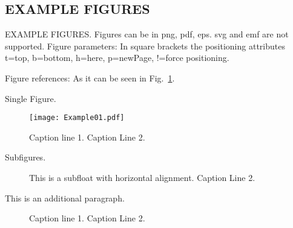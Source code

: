 \subsection{EXAMPLE FIGURES}
\par EXAMPLE FIGURES. Figures can be in png, pdf, eps. svg and emf are not supported.
Figure parameters: In square brackets the positioning attributes t=top, b=bottom, h=here, p=newPage, !=force positioning.
\par Figure references: As it can be seen in Fig.~\ref{fig:SingleFigure}.
\par Single Figure.
\begin{figure}[t]
	\centering
	\texttt{[image: Example01.pdf]}
	\captionsetup{justification=justified}
	\caption{Caption line 1. \newline Caption Line 2.}
	\label{fig:SingleFigure}
\end{figure}

\par Subfigures.
\begin{figure*}[t]
	\centering
	\captionsetup{justification=justified}
	\caption{This is a subfloat with horizontal alignment. \newline Caption Line 2.}
	\label{fig:adjacentFigs}
	\vspace{-5mm}			%
\end{figure*}

\par This is an additional paragraph.

\begin{figure}[t] 
	\centering
	\vfil
	\captionsetup{justification=justified}
	\caption{Caption line 1. \newline Caption Line 2.}
	\label{fig:ColumnFigs}
	\vspace{-4.5mm}
\end{figure}